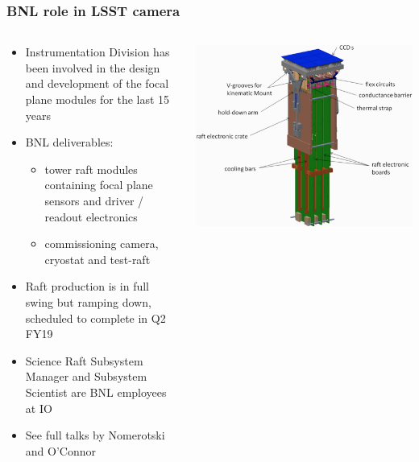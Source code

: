 \documentclass[aspectratio=169]{beamer}
\begin{document}
\begin{frame}

  \frametitle{BNL role in LSST camera}

  \begin{columns}
      \begin{column}{10cm}

          \begin{itemize}

          \item Instrumentation Division has been involved in the
            design and development of the focal plane modules for the
            last 15 years 

          \item BNL deliverables: 

            \begin{itemize}
            \item tower raft modules containing focal plane sensors
              and driver / readout electronics 
            \item commissioning camera, cryostat and test-raft
            \end{itemize}

              \item Raft production is in full swing but ramping down,
                scheduled to complete in Q2 FY19

              \item Science Raft Subsystem Manager and Subsystem Scientist are BNL
                  employees at IO

              \item See full talks by Nomerotski and O'Connor

          \end{itemize}
      \end{column}
      \begin{column}{5cm}
          \includegraphics[width=\linewidth]{./lsstraftx.png}
      \end{column}
  \end{columns}


\end{frame}
\end{document}
